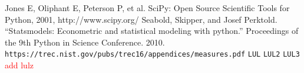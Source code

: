 \documentclass[letterpaper, 10 pt, conference]{ieeeconf}  %
\newcommand\todo[1]{\textcolor{red}{#1}}
\begin{document}






\begin{thebibliography}{99}
 Jones E, Oliphant E, Peterson P, et al. SciPy: Open Source Scientific Tools for Python, 2001, http://www.scipy.org/ 
 Seabold, Skipper, and Josef Perktold. “Statsmodels: Econometric and statistical modeling with python.” Proceedings of the 9th Python in Science Conference. 2010.
 \texttt{https://trec.nist.gov/pubs/trec16/appendices/measures.pdf}
 \texttt{LUL}
 \texttt{LUL2}
 \texttt{LUL3}
\todo{add lulz}
\end{thebibliography}
\end{document}
